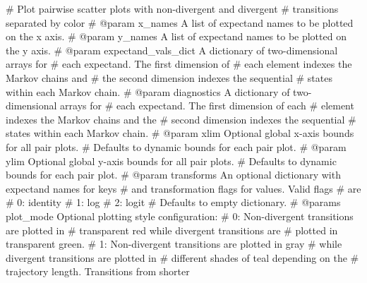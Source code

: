 \documentclass[
  letterpaper,
  DIV=11,
  numbers=noendperiod]{scrartcl}
\newenvironment{Shaded}{\begin{snugshade}}{\end{snugshade}}
\newcommand{\CommentTok}[1]{\textcolor[rgb]{0.37,0.37,0.37}{#1}}
\begin{document}
\begin{Shaded}
\begin{Highlighting}[]
\CommentTok{\# Plot pairwise scatter plots with non{-}divergent and divergent}
\CommentTok{\# transitions separated by color}
\CommentTok{\# @param x\_names A list of expectand names to be plotted on the x axis.}
\CommentTok{\# @param y\_names A list of expectand names to be plotted on the y axis.}
\CommentTok{\# @param expectand\_vals\_dict A dictionary of two{-}dimensional arrays for}
\CommentTok{\#                            each expectand.  The first dimension of}
\CommentTok{\#                            each element indexes the Markov chains and}
\CommentTok{\#                            the second dimension indexes the sequential}
\CommentTok{\#                            states within each Markov chain.}
\CommentTok{\# @param diagnostics A dictionary of two{-}dimensional arrays for}
\CommentTok{\#                    each expectand.  The first dimension of each}
\CommentTok{\#                    element indexes the Markov chains and the}
\CommentTok{\#                    second dimension indexes the sequential}
\CommentTok{\#                    states within each Markov chain.}
\CommentTok{\# @param xlim       Optional global x{-}axis bounds for all pair plots.}
\CommentTok{\#                   Defaults to dynamic bounds for each pair plot.}
\CommentTok{\# @param ylim       Optional global y{-}axis bounds for all pair plots.}
\CommentTok{\#                   Defaults to dynamic bounds for each pair plot.}
\CommentTok{\# @param transforms An optional dictionary with expectand names for keys}
\CommentTok{\#                   and transformation flags for values.  Valid flags}
\CommentTok{\#                   are}
\CommentTok{\#                     0: identity}
\CommentTok{\#                     1: log}
\CommentTok{\#                     2: logit}
\CommentTok{\#                   Defaults to empty dictionary.}
\CommentTok{\# @params plot\_mode Optional plotting style configuration:}
\CommentTok{\#                     0: Non{-}divergent transitions are plotted in}
\CommentTok{\#                        transparent red while divergent transitions are}
\CommentTok{\#                        plotted in transparent green.}
\CommentTok{\#                     1: Non{-}divergent transitions are plotted in gray}
\CommentTok{\#                        while divergent transitions are plotted in}
\CommentTok{\#                        different shades of teal depending on the}
\CommentTok{\#                        trajectory length.  Transitions from shorter}

\end{Highlighting}
\end{Shaded}
\end{document}

